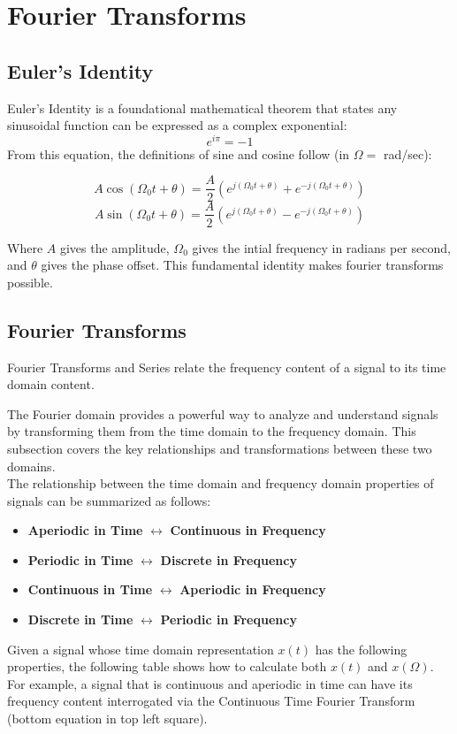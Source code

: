 \documentclass[12pt]{article}
\begin{document}
\section{Fourier Transforms}
\subsection{Euler's Identity}
Euler's Identity is a foundational mathematical theorem that states any sinusoidal function can be expressed as a complex exponential: 
\[e^{i\pi} = -1\]
From this equation, the definitions of sine and cosine follow (in \(\Omega = \) rad/sec):

\[A\cos (\Omega_0 t + \theta) = \frac{A}{2}\left(e^{j(\Omega_0 t + \theta)} + e^{-j(\Omega_0 t + \theta)} \right)\]
\[A\sin (\Omega_0 t + \theta) = \frac{A}{2}\left(e^{j(\Omega_0 t + \theta)} - e^{-j(\Omega_0 t + \theta)} \right)\]

Where \(A\) gives the amplitude, \(\Omega_0\) gives the intial frequency in radians per second, and \(\theta\) gives the phase offset. This fundamental identity makes fourier transforms possible.
\subsection{Fourier Transforms}

Fourier Transforms and Series relate the frequency content of a signal to its time domain content. 

The Fourier domain provides a powerful way to analyze and understand signals by transforming them from the time domain to the frequency domain. This subsection covers the key relationships and transformations between these two domains.\\
The relationship between the time domain and frequency domain properties of signals can be summarized as follows:
\begin{itemize}
    \item \textbf{Aperiodic in Time} $\leftrightarrow$ \textbf{Continuous in Frequency}
    \item \textbf{Periodic in Time} $\leftrightarrow$ \textbf{Discrete in Frequency}
    \item \textbf{Continuous in Time} $\leftrightarrow$ \textbf{Aperiodic in Frequency}
    \item \textbf{Discrete in Time} $\leftrightarrow$ \textbf{Periodic in Frequency}
\end{itemize}

Given a signal whose time domain representation \(x(t)\)  has the following properties, the following table shows how to calculate both \(x(t)\) and \(x(\Omega)\). For example, a signal that is continuous and aperiodic in time can have its frequency content interrogated via the Continuous Time Fourier Transform (bottom equation in top left square). 
\end{document}
